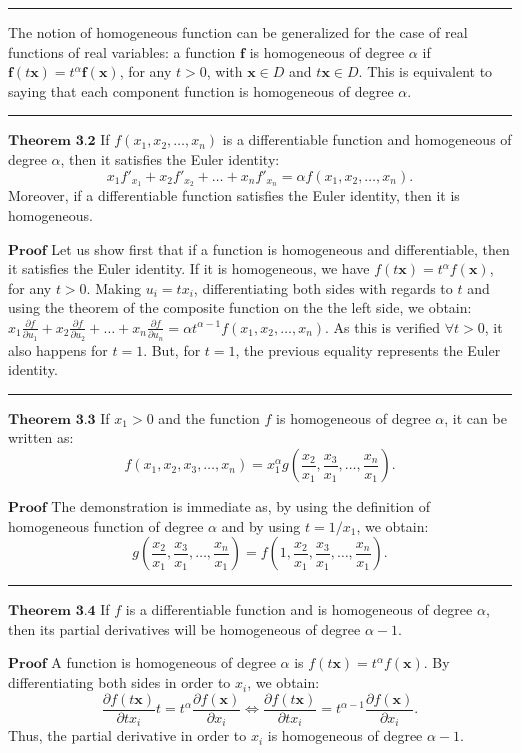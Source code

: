 \documentclass[0pt, a4paper]{article}
\begin{document}
\noindent\rule{\textwidth}{1pt}

The notion of homogeneous function can be generalized for the case of real functions of real variables: a function $\textbf{f}$ is homogeneous of degree $\alpha$ if $\textbf{f}(t\textbf{x})=t^\alpha\textbf{f}(\textbf{x})$, for any $t>0$, with $\textbf{x}\in D$ and $t\textbf{x}\in D$. This is equivalent to saying that each component function is homogeneous of degree $\alpha$.

\noindent\rule{\textwidth}{1pt}

$\textbf{Theorem 3.2}$ If $f(x_1,x_2,\dots,x_n)$ is a differentiable function and homogeneous of degree $\alpha$, then it satisfies the Euler identity:
$$x_1f'_{x_1}+x_2f'_{x_2}+\dots+x_nf'_{x_n}=\alpha f(x_1,x_2,\dots,x_n).$$
Moreover, if a differentiable function satisfies the Euler identity, then it is homogeneous.

$\textbf{Proof}$ Let us show first that if a function is homogeneous and differentiable, then it satisfies the Euler identity. If it is homogeneous, we have $f(t\textbf{x})=t^\alpha f(\textbf{x})$, for any $t>0$. Making $u_i=tx_i$, differentiating both sides with regards to $t$ and using the theorem of the composite function on the the left side, we obtain: $x_1\frac{\partial f}{\partial u_1}+x_2\frac{\partial f}{\partial u_2}+\dots+x_n\frac{\partial f}{\partial u_n}=\alpha t^{\alpha-1} f(x_1,x_2,\dots,x_n)$. As this is verified $\forall t>0$, it also happens for $t=1$. But, for $t=1$, the previous equality represents the Euler identity.

\noindent\rule{\textwidth}{1pt}

$\textbf{Theorem 3.3}$ If $x_1>0$ and the function $f$ is homogeneous of degree $\alpha$, it can be written as:
$$f(x_1,x_2,x_3,\dots,x_n)=x_1^\alpha g(\frac{x_2}{x_1}, \frac{x_3}{x_1},\dots, \frac{x_n}{x_1}).$$

$\textbf{Proof}$ The demonstration is immediate as, by using the definition of homogeneous function of degree $\alpha$ and by using $t=1/x_1$, we obtain:
$$g\left(\frac{x_2}{x_1},\frac{x_3}{x_1},\dots,\frac{x_n}{x_1}\right)=f\left(1,\frac{x_2}{x_1},\frac{x_3}{x_1},\dots,\frac{x_n}{x_1}\right).$$

\noindent\rule{\textwidth}{1pt}

$\textbf{Theorem 3.4}$ If $f$ is a differentiable function and is homogeneous of degree $\alpha$, then its partial derivatives will be homogeneous of degree $\alpha-1$.

$\textbf{Proof}$ A function is homogeneous of degree $\alpha$ is $f(t\textbf{x})=t^\alpha f(\textbf{x})$. By differentiating both sides in order to $x_i$, we obtain:
$$\frac{\partial f(t\textbf{x})}{\partial tx_i}t=t^\alpha\frac{\partial f(\textbf{x})}{\partial x_i}\Leftrightarrow\frac{\partial f(t\textbf{x})}{\partial tx_i}=t^{\alpha-1}\frac{\partial f(\textbf{x})}{\partial x_i}.$$
Thus, the partial derivative in order to $x_i$  is homogeneous of degree $\alpha-1$.
\end{document}
